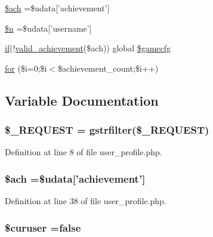 \begin{DoxyCompactItemize}
\item 
\hyperlink{user__profile_8php_aaa5977bacf2f575a8df6032cbd929865}{\$ach} =\$udata\mbox{[}'achievement'\mbox{]}
\item 
\hyperlink{user__profile_8php_aa5fae90470d460a65d5211ec08e6b05c}{\$n} =\$udata\mbox{[}'username'\mbox{]}
\item 
\hyperlink{login__old_8php_a4ac1118c2e44c513a674bc1793ba6c90}{if}(!\hyperlink{achievement_8func_8php_ac7f448e61b96ff060ce1bddaf1826f77}{valid\+\_\+achievement}(\$ach)) global \hyperlink{user__profile_8php_af4ae00ffed2be30bd49a2271157ea9e4}{\$gamecfg}
\item 
\hyperlink{user__profile_8php_a5667e0f8c1d2529626a307f876afc97b}{for} (\$i=0;\$i$<$\$achievement\+\_\+count;\$i++)
\end{DoxyCompactItemize}


\subsection{Variable Documentation}
\hypertarget{user__profile_8php_a0e4b7f3b6c609258c08660a1ec52b89b}{
\subsubsection[{\$\+\_\+\+R\+E\+Q\+U\+E\+S\+T}]{\setlength{\rightskip}{0pt plus 5cm}\$\+\_\+\+R\+E\+Q\+U\+E\+S\+T = {\bf gstrfilter}(\$\+\_\+\+R\+E\+Q\+U\+E\+S\+T)}}\label{user__profile_8php_a0e4b7f3b6c609258c08660a1ec52b89b}


Definition at line 8 of file user\+\_\+profile.\+php.

\hypertarget{user__profile_8php_aaa5977bacf2f575a8df6032cbd929865}{
\subsubsection[{\$ach}]{\setlength{\rightskip}{0pt plus 5cm}\$ach =\$udata\mbox{[}'achievement'\mbox{]}}}\label{user__profile_8php_aaa5977bacf2f575a8df6032cbd929865}


Definition at line 38 of file user\+\_\+profile.\+php.

\hypertarget{user__profile_8php_aeb4d2776248b452f64c63063379d2035}{
\subsubsection[{\$curuser}]{\setlength{\rightskip}{0pt plus 5cm}\$curuser ={\bf false}}}\label{user__profile_8php_aeb4d2776248b452f64c63063379d2035}


